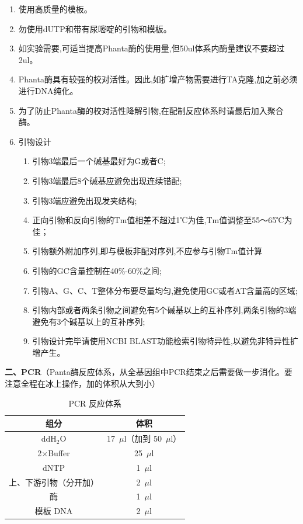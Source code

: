 \begin{enumerate}[itemsep=0.1em]
\item 使用高质量的模板。
\item 勿使用dUTP和带有尿嘧啶的引物和模板。
\item 如实验需要,可适当提高Phanta酶的使用量,但50ul体系内酶量建议不要超过2ul。
\item Phanta酶具有较强的校对活性。因此,如扩增产物需要进行TA克隆,加之前必须进行DNA纯化。
\item 为了防止Phanta酶的校对活性降解引物,在配制反应体系时请最后加入聚合酶。
\item 引物设计
\begin{enumerate}[label={（\arabic*）}, itemsep=0.1em]
  \item 引物3端最后一个碱基最好为G或者C;
  \item 引物3端最后8个碱基应避免出现连续错配;
  \item 引物3端应避免出现发夹结构;
  \item 正向引物和反向引物的Tm值相差不超过1℃为佳,Tm值调整至55～65℃为佳；
  \item 引物额外附加序列,即与模板非配对序列,不应参与引物Tm值计算
  \item 引物的GC含量控制在40\%-60\%之间;
  \item 引物A、G、C、T整体分布要尽量均匀,避免使用GC或者AT含量高的区域;
  \item 引物内部或者两条引物之间避免有5个碱基以上的互补序列,两条引物的3端避免有3个碱基以上的互补序列;
  \item 引物设计完毕请使用NCBI BLAST功能检索引物特异性,以避免非特异性扩增产生。
\end{enumerate}
\end{enumerate}

\textbf{二、PCR}（Panta酶反应体系，从全基因组中PCR结束之后需要做一步消化。要注意全程在冰上操作，加的体积从大到小）

\begin{longtable}{cc}
  \caption{PCR 反应体系} \\
  \toprule
  \textbf{组分} & \textbf{体积} \\
  \midrule

  ddH$_2$O & 17~$\mu$l（加到 50~$\mu$l） \\
  2$\times$Buffer & 25~$\mu$l \\
  dNTP & 1~$\mu$l \\
  上、下游引物（分开加） & 2~$\mu$l \\
  酶 & 1~$\mu$l \\
  模板 DNA & 2~$\mu$l \\

  \bottomrule
\end{longtable}


